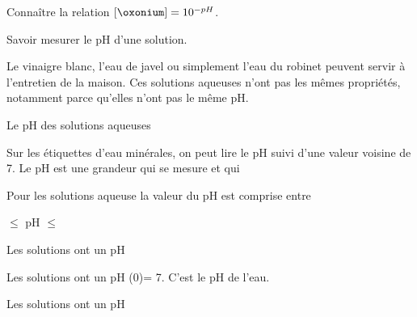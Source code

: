 \tetePremStssChim
\vspace*{-36pt}

\begin{objectifs}
  \item Connaître la relation $[\oxonium] = 10^{-pH}$.
  \item Savoir mesurer le pH d'une solution.
\end{objectifs}


\begin{contexte}
  Le vinaigre blanc, l'eau de javel ou simplement l'eau du robinet peuvent servir à l'entretien de la maison.
  Ces solutions aqueuses n'ont pas les mêmes propriétés, notamment parce qu'elles n'ont pas le même pH.

\end{contexte}


\begin{doc}{Le pH des solutions aqueuses}
  
  Sur les étiquettes d'eau minérales, on peut lire le pH suivi d'une valeur voisine de 7.
  Le pH est une grandeur qui se mesure et qui 
  
  \begin{importants}
    Pour les solutions aqueuse la valeur du pH est comprise entre
    \begin{center}
       $\leq$ pH $\leq$ 
    \end{center}
  \end{importants}

  \begin{importants}
    \begin{listePoints}
      \item Les solutions  ont un pH 
      \item Les solutions  ont un pH \texteTrou(0){= 7. C'est le pH de l'eau.}
      \item Les solutions  ont un pH 
    \end{listePoints}
  \end{importants}
\end{doc}

